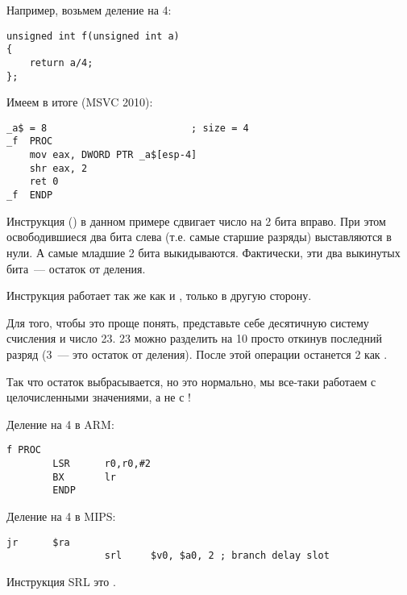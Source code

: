 
\label{division_by_shifting}

Например, возьмем деление на 4:

\begin{lstlisting}
unsigned int f(unsigned int a)
{
	return a/4;
};
\end{lstlisting}

Имеем в итоге (MSVC 2010):

\begin{lstlisting}[caption=MSVC 2010]
_a$ = 8							; size = 4
_f	PROC
	mov	eax, DWORD PTR _a$[esp-4]
	shr	eax, 2
	ret	0
_f	ENDP
\end{lstlisting}

\label{SHR}
Инструкция \SHR () в данном примере сдвигает число на 2 бита вправо. 
При этом освободившиеся два бита слева (т.е. самые 
старшие разряды) выставляются в нули. А самые младшие 2 бита выкидываются. 
Фактически, эти два выкинутых бита~--- остаток от деления.

Инструкция \SHR работает так же как и \SHL, только в другую сторону.



Для того, чтобы это проще понять, представьте себе десятичную систему счисления и число 23. 
23 можно разделить на 10 просто откинув последний разряд (3~--- это остаток от деления). 
После этой операции останется 2 как .

Так что остаток выбрасывается, но это нормально, мы все-таки работаем с целочисленными
значениями, а не с !

Деление на 4 в ARM:

\begin{lstlisting}[caption=\NonOptimizingKeilVI (\ARMMode)]
f PROC
        LSR      r0,r0,#2
        BX       lr
        ENDP
\end{lstlisting}

Деление на 4 в MIPS:

\begin{lstlisting}[caption=\Optimizing GCC 4.4.5 (IDA)]
                 jr      $ra
                 srl     $v0, $a0, 2 ; branch delay slot
\end{lstlisting}

Инструкция SRL это .
